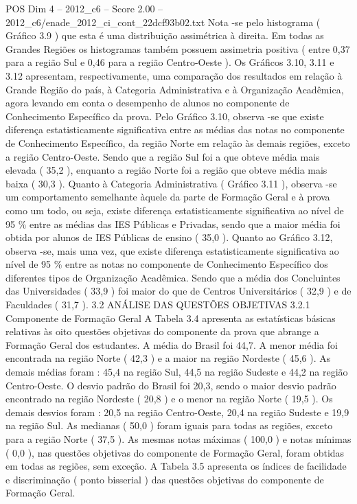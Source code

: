 \begin{textsample}{POS Dim 4 – 2012\_c6 – Score 2.00 – 2012\_c6/enade\_2012\_ci\_cont\_22dcf93b02.txt}
Nota -se pelo histograma ( Gráfico 3.9 ) que esta é uma distribuição assimétrica à direita.
Em todas as Grandes Regiões os histogramas também possuem assimetria positiva ( entre 0,37 para a região Sul e 0,46 para a região Centro-Oeste ).
Os Gráficos 3.10, 3.11 e 3.12 apresentam, respectivamente, uma comparação dos resultados em relação à Grande Região do país, à Categoria Administrativa e à Organização Acadêmica, agora levando em conta o desempenho de alunos no componente de Conhecimento Específico da prova.
Pelo Gráfico 3.10, observa -se que existe diferença estatisticamente significativa entre as médias das notas no componente de Conhecimento Específico, da região Norte em relação às demais regiões, exceto a região Centro-Oeste.
Sendo que a região Sul foi a que obteve média mais elevada ( 35,2 ), enquanto a região Norte foi a região que obteve média mais baixa ( 30,3 ).
Quanto à Categoria Administrativa ( Gráfico 3.11 ), observa -se um comportamento semelhante àquele da parte de Formação Geral e à prova como um todo, ou seja, existe diferença estatisticamente significativa ao nível de 95 \% entre as médias das IES Públicas e Privadas, sendo que a maior média foi obtida por alunos de IES Públicas de ensino ( 35,0 ).
Quanto ao Gráfico 3.12, observa -se, mais uma vez, que existe diferença estatisticamente significativa ao nível de 95 \% entre as notas no componente de Conhecimento Específico dos diferentes tipos de Organização Acadêmica.
Sendo que a média dos Concluintes das Universidades ( 33,9 ) foi maior do que de Centros Universitários ( 32,9 ) e de Faculdades ( 31,7 ). 3.2 ANÁLISE DAS QUESTÕES OBJETIVAS 3.2.1 Componente de Formação Geral A Tabela 3.4 apresenta as estatísticas básicas relativas às oito questões objetivas do componente da prova que abrange a Formação Geral dos estudantes.
A média do Brasil foi 44,7.
A menor média foi encontrada na região Norte ( 42,3 ) e a maior na região Nordeste ( 45,6 ).
As demais médias foram : 45,4 na região Sul, 44,5 na região Sudeste e 44,2 na região Centro-Oeste.
O desvio padrão do Brasil foi 20,3, sendo o maior desvio padrão encontrado na região Nordeste ( 20,8 ) e o menor na região Norte ( 19,5 ).
Os demais desvios foram : 20,5 na região Centro-Oeste, 20,4 na região Sudeste e 19,9 na região Sul.
As medianas ( 50,0 ) foram iguais para todas as regiões, exceto para a região Norte ( 37,5 ).
As mesmas notas máximas ( 100,0 ) e notas mínimas ( 0,0 ), nas questões objetivas do componente de Formação Geral, foram obtidas em todas as regiões, sem exceção.
A Tabela 3.5 apresenta os índices de facilidade e discriminação ( ponto bisserial ) das questões objetivas do componente de Formação Geral.

\end{textsample}
